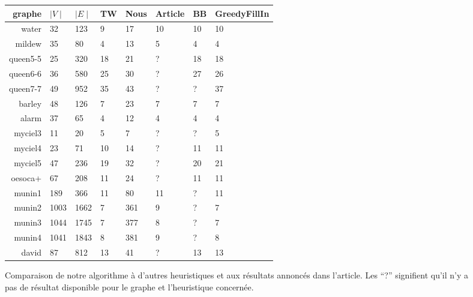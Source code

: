 \documentclass{article}
\begin{document}
\begin{figure}[h!]
  \centering
  \begin{tabular}{r|l|l|l|l|l|l|l}
    graphe   & $\mid V \mid$ & $\mid E \mid$ & TW  & Nous & Article & BB & GreedyFillIn\\
    \hline
    water    & 32  &123 & 9   & 17  & 10 & 10 & 10 \\
    mildew   & 35  & 80 & 4   & 13  & 5 & 4 & 4 \\
    queen5-5 & 25 & 320 &18   & 21 & ? & 18 & 18\\
    queen6-6 & 36 & 580 &25   & 30 & ? & 27 & 26\\
    queen7-7 & 49 & 952 &35   & 43 & ? & ? & 37\\
    barley   & 48 & 126 &7   & 23  & 7 & 7 & 7 \\
    alarm    & 37 & 65 &4   & 12  &  4 & 4 & 4\\
    myciel3  & 11 & 20 &5    & 7  & ? & ? & 5\\
    myciel4  & 23 & 71& 10   & 14 & ? & 11 & 11\\
    myciel5  & 47 & 236&19   & 32 & ? & 20 & 21\\
    oesoca+  & 67 & 208 &11   & 24 & ? & 11 & 11\\
    munin1   & 189 & 366 & 11   & 80 & 11 & ? & 11\\
    munin2   & 1003& 1662&7  & 361  & 9 & ? & 7\\
    munin3   & 1044& 1745&7  & 377  & 8 & ? & 7\\
    munin4   & 1041& 1843&8  & 381  & 9 & ? & 8\\
    david    & 87 & 812 &13   & 41 & ? & 13 & 13\\
  \end{tabular}
  \caption{Comparaison de notre algorithme à d'autres heuristiques et
    aux résultats annoncés dans l'article. Les ``?'' signifient qu'il
    n'y a pas de résultat disponible pour le graphe et l'heuristique
    concernée.}
  \label{fig}
\end{figure}

\newpage


\end{document}

